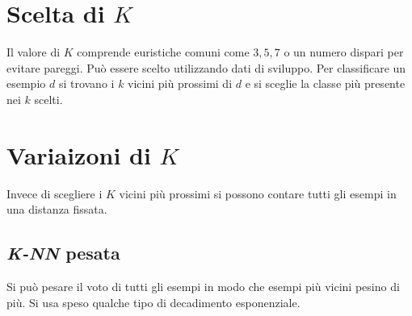 \section{Scelta di $K$}
Il valore di $K$ comprende euristiche comuni come $3, 5, 7$ o un numero dispari per evitare pareggi.
Pu\`o essere scelto utilizzando dati di sviluppo.
Per classificare un esempio $d$ si trovano i $k$ vicini pi\`u prossimi di $d$ e si sceglie la classe pi\`u presente nei $k$ scelti.

\section{Variaizoni di $K$}
Invece di scegliere i $K$ vicini pi\`u prossimi si possono contare tutti gli esempi in una distanza fissata.

	\subsection{\emph{K-NN} pesata}
	Si pu\`o pesare il voto di tutti gli esempi in modo che esempi pi\`u vicini pesino di pi\`u.
	Si usa speso qualche tipo di decadimento esponenziale.

